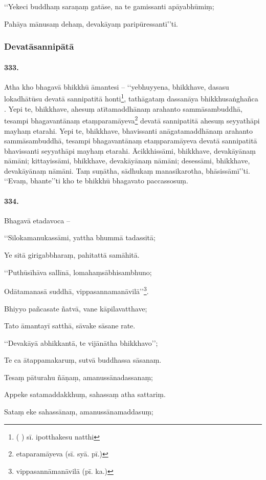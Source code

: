 ‘‘Yekeci buddhaṃ saraṇaṃ gatāse, na te gamissanti apāyabhūmiṃ;

Pahāya mānusaṃ dehaṃ, devakāyaṃ paripūressantī’’ti.

\subsubsection{Devatāsannipātā}

\paragraph{333.} Atha kho bhagavā bhikkhū āmantesi – ‘‘yebhuyyena, bhikkhave, dasasu lokadhātūsu devatā sannipatitā honti\footnote{( ) sī. ipotthakesu natthi}, tathāgataṃ dassanāya bhikkhusaṅghañca . Yepi te, bhikkhave, ahesuṃ atītamaddhānaṃ arahanto sammāsambuddhā, tesampi bhagavantānaṃ etaṃparamāyeva\footnote{etaparamāyeva (sī. syā. pī.)} devatā sannipatitā ahesuṃ seyyathāpi mayhaṃ etarahi. Yepi te, bhikkhave, bhavissanti anāgatamaddhānaṃ arahanto sammāsambuddhā, tesampi bhagavantānaṃ etaṃparamāyeva devatā sannipatitā bhavissanti seyyathāpi mayhaṃ etarahi. Ācikkhissāmi, bhikkhave, devakāyānaṃ nāmāni; kittayissāmi, bhikkhave, devakāyānaṃ nāmāni; desessāmi, bhikkhave, devakāyānaṃ nāmāni. Taṃ suṇātha, sādhukaṃ manasikarotha, bhāsissāmī’’ti. ‘‘Evaṃ, bhante’’ti kho te bhikkhū bhagavato paccassosuṃ.

\paragraph{334.} Bhagavā etadavoca –

‘‘Silokamanukassāmi, yattha bhummā tadassitā;

Ye sitā girigabbharaṃ, pahitattā samāhitā.

‘‘Puthūsīhāva sallīnā, lomahaṃsābhisambhuno;

Odātamanasā suddhā, vippasannamanāvilā’’\footnote{vippasannāmanāvilā (pī. ka.)}.

Bhiyyo pañcasate ñatvā, vane kāpilavatthave;

Tato āmantayī satthā, sāvake sāsane rate.

‘‘Devakāyā abhikkantā, te vijānātha bhikkhavo’’;

Te ca ātappamakaruṃ, sutvā buddhassa sāsanaṃ.

Tesaṃ pāturahu ñāṇaṃ, amanussānadassanaṃ;

Appeke satamaddakkhuṃ, sahassaṃ atha sattariṃ.

Sataṃ eke sahassānaṃ, amanussānamaddasuṃ;

